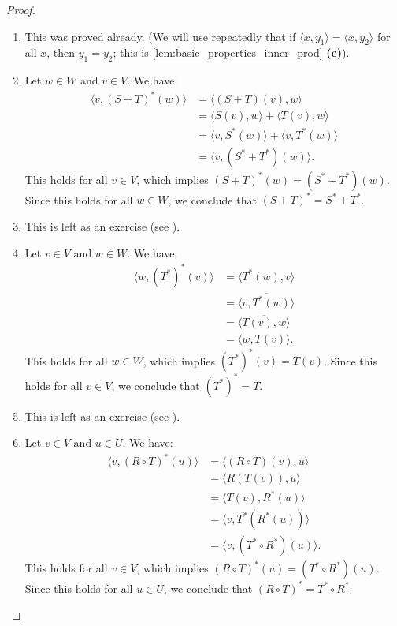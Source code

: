 \begin{proof}
\begin{enumerate}[label=\textbf{(\alph*)}]
    \item This was proved already. (We will use repeatedly that if $\langle x, y_1 \rangle = \langle x, y_2 \rangle$ for all $x$, then $y_1 = y_2$; this is \cref{lem:basic_properties_inner_prod} \textbf{(c)}).
    \item Let $w \in W$ and $v \in V$. We have:
    \begin{align*}
        \langle v, (S+T)^*(w) \rangle &= \langle (S+T)(v), w \rangle \\
        &= \langle S(v), w \rangle + \langle T(v), w \rangle \\
        &= \langle v, S^*(w) \rangle + \langle v, T^*(w) \rangle \\
        &= \langle v, (S^*+T^*)(w) \rangle.
    \end{align*}
    This holds for all $v \in V$, which implies $(S+T)^*(w) = (S^*+T^*)(w)$. Since this holds for all $w \in W$, we conclude that $(S+T)^* = S^* + T^*$.
    \item This is left as an exercise (see ).
    \item Let $v \in V$ and $w \in W$. We have:
    \begin{align*}
        \langle w, (T^*)^*(v) \rangle &= \langle T^*(w), v \rangle \\
        &= \overline{\langle v, T^*(w) \rangle} \\
        &= \overline{\langle T(v), w \rangle} \\
        &= \langle w, T(v) \rangle.
    \end{align*}
    This holds for all $w \in W$, which implies $(T^*)^*(v) = T(v)$. Since this holds for all $v \in V$, we conclude that $(T^*)^* = T$.
    \item This is left as an exercise (see ).
    \item Let $v \in V$ and $u \in U$. We have:
    \begin{align*}
        \langle v, (R \circ T)^*(u) \rangle &= \langle (R \circ T)(v), u \rangle \\
        &= \langle R(T(v)), u \rangle \\
        &= \langle T(v), R^*(u) \rangle \\
        &= \langle v, T^*(R^*(u)) \rangle \\
        &= \langle v, (T^* \circ R^*)(u) \rangle.
    \end{align*}
    This holds for all $v \in V$, which implies $(R \circ T)^*(u) = (T^* \circ R^*)(u)$. Since this holds for all $u \in U$, we conclude that $(R \circ T)^* = T^* \circ R^*$.
\end{enumerate}
\end{proof}

